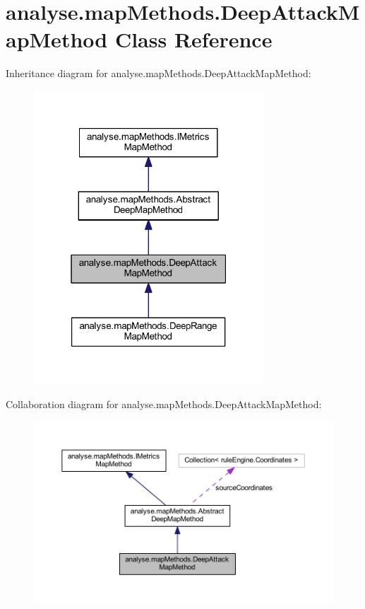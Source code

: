 \hypertarget{classanalyse_1_1map_methods_1_1_deep_attack_map_method}{}\section{analyse.\+map\+Methods.\+Deep\+Attack\+Map\+Method Class Reference}
\label{classanalyse_1_1map_methods_1_1_deep_attack_map_method}


Inheritance diagram for analyse.\+map\+Methods.\+Deep\+Attack\+Map\+Method\+:
\nopagebreak
\begin{figure}[H]
\begin{center}
\leavevmode
\includegraphics[width=244pt]{classanalyse_1_1map_methods_1_1_deep_attack_map_method__inherit__graph}
\end{center}
\end{figure}


Collaboration diagram for analyse.\+map\+Methods.\+Deep\+Attack\+Map\+Method\+:
\nopagebreak
\begin{figure}[H]
\begin{center}
\leavevmode
\includegraphics[width=350pt]{classanalyse_1_1map_methods_1_1_deep_attack_map_method__coll__graph}
\end{center}
\end{figure}
